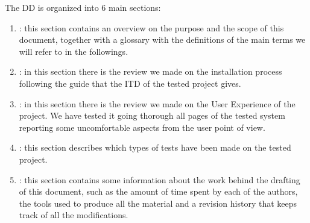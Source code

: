 The DD is organized into 6 main sections:

\begin{enumerate}
\item {\textbf{}}: this section contains an overview on the purpose and the scope of this document, together with a glossary with the definitions of the main terms we will refer to in the followings.
\item {\textbf{}}: in this section there is the review we made on the installation process following the guide that the ITD of the tested project gives. 
\item {\textbf{}}: in this section there is the review we made on the User Experience of the project. We have tested it going thorough all pages of the tested system reporting some uncomfortable aspects from the user point of view.
\item {\textbf{}}: this section describes which types of tests have been made on the tested project.
\item {\textbf{}}: this section contains some information about the work behind the drafting of this
document, such as the amount of time spent by each of the authors, the tools used to produce all
the material and a revision history that keeps track of all the modifications.
\end{enumerate}